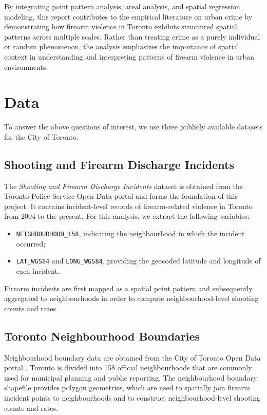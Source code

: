\documentclass{article}
\begin{document}
\noindent By integrating point pattern analysis, areal analysis, and spatial regression modeling, this report contributes to the empirical literature on urban crime by demonstrating how firearm violence in Toronto exhibits structured spatial patterns across multiple scales. Rather than treating crime as a purely individual or random phenomenon, the analysis emphasizes the importance of spatial context in understanding and interpreting patterns of firearm violence in urban environments.

\section{Data}

\noindent To answer the above questions of interest, we use three publicly available datasets for the City of Toronto.

\subsection{Shooting and Firearm Discharge Incidents}

\noindent \noindent The \textit{Shooting and Firearm Discharge Incidents} dataset is obtained from the Toronto Police Service Open Data portal \citep{tps_shootings_open_data} and forms the foundation of this project. It contains incident-level records of firearm-related violence in Toronto from 2004 to the present. For this analysis, we extract the following variables:
\begin{itemize}
    \item \texttt{NEIGHBOURHOOD\_158}, indicating the neighbourhood in which the incident occurred;
    \item \texttt{LAT\_WGS84} and \texttt{LONG\_WGS84}, providing the geocoded latitude and longitude of each incident.
\end{itemize}

\noindent Firearm incidents are first mapped as a spatial point pattern and subsequently aggregated to neighbourhoods in order to compute neighbourhood-level shooting counts and rates.

\subsection{Toronto Neighbourhood Boundaries}

\noindent \noindent Neighbourhood boundary data are obtained from the City of Toronto Open Data portal \citep{city_toronto_neighbourhoods}.
Toronto is divided into 158 official neighbourhoods that are commonly used for municipal planning and public reporting. The neighbourhood boundary shapefile provides polygon geometries, which are used to spatially join firearm incident points to neighbourhoods and to construct neighbourhood-level shooting counts and rates.
\end{document}
